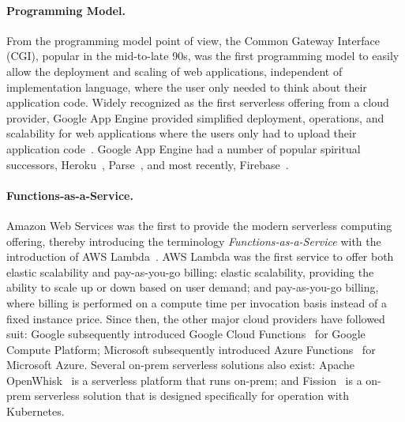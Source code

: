 \hide
{

\paragraph{Programming Model.}  From the programming model point of view, the Common Gateway Interface (CGI), popular in the mid-to-late 90s, was the first programming model to easily allow the deployment and scaling of web applications, independent of implementation language, where the user only needed to think about their application code.  Widely recognized as the first serverless offering from a cloud provider, Google App Engine provided simplified deployment, operations, and scalability for web applications where the users only had to upload their application code~\cite{google-app-engine}.  Google App Engine had a number of popular spiritual successors, Heroku~\cite{heroku}, Parse~\cite{parse}, and most recently, Firebase~\cite{firebase}.


\paragraph{Functions-as-a-Service.} Amazon Web Services was the first to provide the modern serverless computing offering, thereby introducing the terminology \textit{Functions-as-a-Service} with the introduction of AWS Lambda~\cite{aws-lambda}.  AWS Lambda was the first service to offer both elastic scalability and pay-as-you-go billing: elastic scalability, providing the ability to scale up or down based on user demand; and pay-as-you-go billing, where billing is performed on a compute time per invocation basis instead of a fixed instance price.  Since then, the other major cloud providers have followed suit: Google subsequently introduced Google Cloud Functions~\cite{google-cloud-functions} for Google Compute Platform; Microsoft subsequently introduced Azure Functions~\cite{azure-functions} for Microsoft Azure.  Several on-prem serverless solutions also exist: Apache OpenWhisk~\cite{openwhisk} is a serverless platform that runs on-prem; and Fission~\cite{fission} is a on-prem serverless solution that is designed specifically for operation with Kubernetes. 


}
